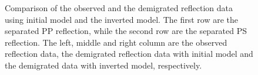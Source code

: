 \begin{figure}[!htb]
   \caption{Comparison of the observed and the demigrated reflection data using
   initial model and the inverted model. The first row are the separated PP
   reflection, while the second row are the separated PS reflection. 
   The left, middle and right column are the observed reflection data, the
   demigrated reflection data with initial model
   and the demigrated data with inverted model, respectively. }
   \label{fig:Data_comparison}
\end{figure}
